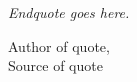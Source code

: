 
\backmatter

\normalfont
\cleartooddpage

\pagestyle{empty}

\begin{table}[b!]
\begin{center}
\textit{Endquote goes here.}

\end{center}
\begin{flushright}
Author of quote,\\
Source of quote

\end{flushright}
\end{table}